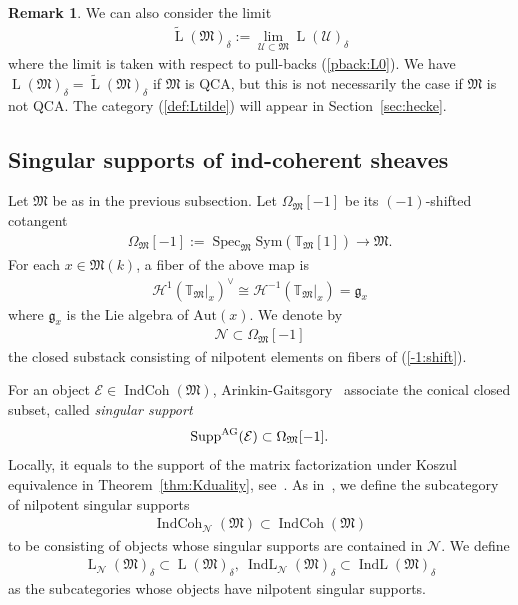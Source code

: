 \documentclass [11pt,oneside,a4paper,mathscr]{amsart}
\theoremstyle{definition}
\newtheorem{remark}[thm]{Remark}
\newcommand{\LL}{\operatorname{L}}
\newcommand{\IndCoh}{\operatorname{IndCoh}}
\newcommand{\IndL}{\operatorname{IndL}}
\newcommand{\Spec}{\operatorname{Spec}}
\begin{document}
\begin{remark}\label{rmk:Ltilde}
We can also consider the limit 
\begin{align}\label{def:Ltilde}
\widetilde{\LL}(\mathfrak{M})_{\delta}:=\lim_{\mathcal{U}\subset \mathfrak{M}}\LL(\mathcal{U})_{\delta} 
\end{align}
where the limit is taken with respect to pull-backs (\ref{pback:L0}). 
We have $\LL(\mathfrak{M})_{\delta}=\widetilde{\LL}(\mathfrak{M})_{\delta}$ if $\mathfrak{M}$ is 
QCA, but this is not necessarily the case if $\mathfrak{M}$ is not QCA. 
The category (\ref{def:Ltilde}) will appear in Section~\ref{sec:hecke}. 
\end{remark}

\subsection{Singular supports of ind-coherent sheaves}\label{subsec:singular}
Let $\mathfrak{M}$ be as in the previous subsection. 
Let $\Omega_{\mathfrak{M}}[-1]$ be its $(-1)$-shifted cotangent 
\begin{align}\label{-1:shift}
    \Omega_{\mathfrak{M}}[-1]:=\Spec_{\mathfrak{M}} \mathrm{Sym}(\mathbb{T}_{\mathfrak{M}}[1]) \to \mathfrak{M}. 
\end{align}
For each $x\in \mathfrak{M}(k)$, a fiber of the above 
map is 
\begin{align*}
    \mathcal{H}^1(\mathbb{T}_{\mathfrak{M}}|_x)^{\vee} \cong 
    \mathcal{H}^{-1}(\mathbb{T}_{\mathfrak{M}}|_{x})=\mathfrak{g}_x
\end{align*}
where $\mathfrak{g}_x$ is the Lie algebra of $\mathrm{Aut}(x)$. We denote by 
\begin{align}\label{nilp:N}
    \mathcal{N}\subset \Omega_{\mathfrak{M}}[-1]
\end{align}
the closed substack consisting of nilpotent elements on fibers of (\ref{-1:shift}). 

For an object $\mathcal{E} \in \IndCoh(\mathfrak{M})$, Arinkin-Gaitsgory~\cite{AG} 
associate the conical closed subset, called \textit{singular support}
\begin{align}\notag
    \mathrm{Supp}^{\mathrm{AG}}(\mathcal{E}) \subset \Omega_{\mathfrak{M}}[-1]. 
\end{align}
Locally, it equals to the support of the matrix factorization under Koszul 
equivalence in Theorem~\ref{thm:Kduality}, see~\cite[Proposition~2.3.9]{T}.  
As in~\cite{AG}, we define the subcategory of nilpotent singular supports
\begin{align*}
    \IndCoh_{\mathcal{N}}(\mathfrak{M}) \subset \IndCoh(\mathfrak{M})
\end{align*}
to be consisting of objects whose singular supports are contained in $\mathcal{N}$. 
We define 
\begin{align}\label{nilp:L}
\LL_{\mathcal{N}}(\mathfrak{M})_{\delta}\subset \LL(\mathfrak{M})_{\delta}, \ 
\IndL_{\mathcal{N}}(\mathfrak{M})_{\delta} \subset \IndL(\mathfrak{M})_{\delta}
\end{align}
as the subcategories whose objects have nilpotent singular supports. 
\end{document}
